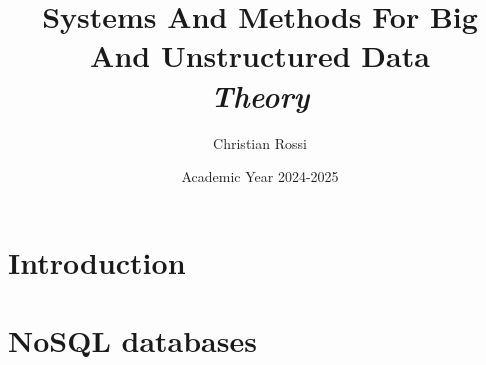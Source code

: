 \documentclass[12pt, a4paper]{report}
\title{\textbf{Systems And Methods For Big And Unstructured Data} \\ \textit{Theory}}
\author{Christian Rossi}
\date{Academic Year 2024-2025}
\begin{document}
    \maketitle

    

    \cleardoublepage

    \tableofcontents

    \cleardoublepage

    \chapter{Introduction}
    
    
    
    

    \chapter{NoSQL databases}
    
    

    
\end{document}
